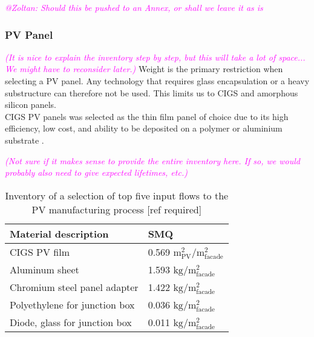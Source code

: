 \textcolor{magenta}{\textit{@Zoltan: Should this be pushed to an Annex, or shall we leave it as is}}

\subsubsection*{PV Panel}
\textcolor{magenta}{\textit{(It is nice to explain the inventory step by step, but this will take a lot of space... We might have to reconsider later.)}}
Weight is the primary restriction when selecting a PV panel. Any technology that requires glass encapsulation or a heavy substructure can therefore not be used. This limits us to CIGS and amorphous silicon panels.\\

CIGS PV panels was selected as the thin film panel of choice due to its high efficiency, low cost, and ability to be deposited on a polymer or aluminium substrate \cite{chirilua2011highly}. 


\textcolor{magenta}{\textit{(Not sure if it makes sense to provide the entire inventory here. If so, we would probably also need to give expected lifetimes, etc.)}}


\begin{table}[H]
\centering
\begin{tabular}{ll}
\hline
Material description & SMQ \\ \hline
CIGS PV film       	 & 0.569 ${\mathrm{m^2_{PV}/m^2_{facade}}}$\\
Aluminum sheet 	 & 1.593 ${\mathrm{kg/m^2_{facade}}}$\\
Chromium steel panel adapter  & 1.422 ${\mathrm{kg/m^2_{facade}}}$\\
Polyethylene for junction box & 0.036 ${\mathrm{kg/m^2_{facade}}}$\\
Diode, glass for junction box & 0.011 ${\mathrm{kg/m^2_{facade}}}$\\
\hline
\end{tabular}
\caption{Inventory of a selection of top five input flows to the PV manufacturing process [ref required]}
\label{tab:PVinv}
\end{table}

